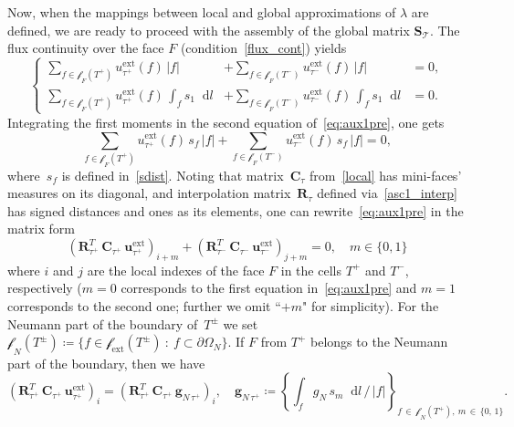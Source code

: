 \documentclass[12pt]{article}
\newcommand{\vect}[1]{\boldsymbol{\mathbf{#1}}}
\newcommand{\bcell}{T}
\newcommand{\bmesh}{{\vect{\mathcal T}}}
\newcommand{\mmesh}{{\vect{\mathcal \tau}}}
\newcommand{\mfaces}[1][]{{\vect{\mathcal f}_{\text{#1}}}}
\newcommand*\diff{\mathop{}\!\mathrm{d}}
\begin{document}
	Now, when the mappings between local and global approximations of $\lambda$ are defined, we are ready to proceed with the assembly of the global matrix $\vect S_\bmesh$. The flux continuity over the face $F$ \big(condition~\eqref{flux_cont}\big) yields
	\begin{equation}\label{eq:aux1pre}
		\left\{\begin{split}
			\sum_{f\in \mfaces_F(T^+)} u^{\text{ext}}_{\mmesh^+}(f)\,|f| &+ \sum_{f\in \mfaces_F(T^-)} u^{\text{ext}}_{\mmesh^-}(f)\,|f| &= 0, \\
			\sum_{f\in \mfaces_F(T^+)} u^{\text{ext}}_{\mmesh^+}(f)\,\int_{f} s_1 \diff{l} &+ \sum_{f\in \mfaces_F(T^-)} u^{\text{ext}}_{\mmesh^-}(f)\,\int_{f} s_1 \diff{l} &= 0.
		\end{split}\right.
	\end{equation}
	{\color{blue}Integrating the first moments in the second equation of~{\eqref{eq:aux1pre}}, one gets}
	\begin{equation*}
		\sum_{f\in \mfaces_F(T^+)} u^{\text{ext}}_{\mmesh^+}(f)\,s_f\,|f| +
		\sum_{f\in \mfaces_F(T^-)} u^{\text{ext}}_{\mmesh^-}(f)\,s_f\,|f| = 0,
	\end{equation*}
	{\color{blue}where~$s_f$ is defined in~{\eqref{sdist}}. Noting that matrix~$\vect C_\mmesh$ from~{\eqref{local}} has mini-faces' measures on its diagonal, and interpolation matrix~$\vect R_\mmesh$ defined via~{\eqref{asc1_interp}} has signed distances and ones as its elements, one can rewrite~{\eqref{eq:aux1pre}} in the matrix form}
	\begin{equation}\label{eq:aux1}
		\left( \vect R^T_{\mmesh^+}\,\vect C_{\mmesh^+}\,{\vect u}^{\text{ext}}_{\mmesh^+} \right)_{i+m} + \left( \vect R^T_{\mmesh^-}\,\vect C_{\mmesh^-}\,{\vect u}^{\text{ext}}_{\mmesh^-} \right)_{j+m} = 0, \quad m \in \{0, 1\}
	\end{equation}
	where $i$ and $j$ are the local indexes of the face $F$ in the cells $T^+$ and $T^-$, respectively ($m = 0$ corresponds to the first equation in~\eqref{eq:aux1pre} and $m = 1$ corresponds to the second one; further we omit ``$+m$" for simplicity). For the Neumann part of the boundary of~$\bcell^\pm$ we set $\mfaces_N(\bcell^\pm) \coloneqq \{ f \in \mfaces[ext](\bcell^\pm)\::\:f \subset \partial\Omega_N \}$. If $F$ from $T^+$ belongs to the Neumann part of the boundary, then we have
	\begin{equation*}
		\left( \vect R^T_{\mmesh^+}\,\vect C_{\mmesh^+}\,{\vect u}^{\text{ext}}_{\mmesh^+} \right)_i = \left( \vect R^T_{\mmesh^+}\,\vect C_{\mmesh^+}\,{\vect g}_{N\,\mmesh^+} \right)_i, \quad
		{\vect g}_{N\,\mmesh^+} \coloneqq \left\{ \int_f g_N\,s_m \diff{l}\,/\,|f| \right\}_{f\,\in\,\mfaces_N(\bcell^+),\:m\,\in\,\{0,\,1\}}.
	\end{equation*}
	
\end{document}
